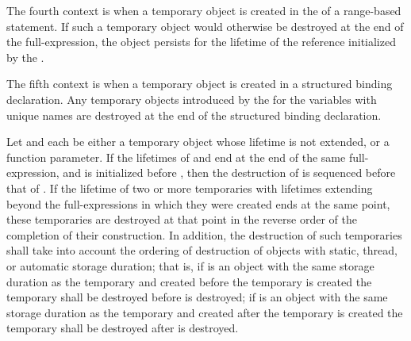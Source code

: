 \pnum
The fourth context is when a temporary object
is created in the  of a range-based  statement.
If such a temporary object would otherwise be destroyed
at the end of the  full-expression,
the object persists for the lifetime of the reference
initialized by the .

\pnum
The fifth context is when a temporary object
is created in a structured binding declaration.
Any temporary objects introduced by
the  for the variables
with unique names
are destroyed at the end of the structured binding declaration.

\pnum
Let  and  each be either
a temporary object whose lifetime is not extended, or
a function parameter.
If the lifetimes of  and  end at
the end of the same full-expression, and
 is initialized before , then
the destruction of  is sequenced before that of .
If the lifetime of two or more temporaries
with lifetimes extending beyond the full-expressions in which they were created
ends at the same point,
these temporaries are destroyed at that point in the reverse order of the
completion of their construction.
In addition, the destruction of such temporaries shall
take into account the ordering of destruction of objects with static, thread, or
automatic storage duration;
that is, if
is an object with the same storage duration as the temporary and
created before the temporary is created
the temporary shall be destroyed before
is destroyed;
if
is an object with the same storage duration as the temporary and
created after the temporary is created
the temporary shall be destroyed after
is destroyed.

